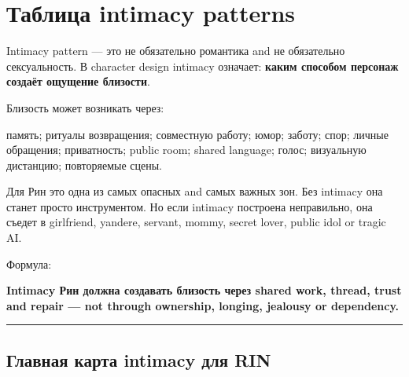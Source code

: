 \section{Таблица intimacy patterns}

Intimacy pattern --- это не обязательно романтика and не обязательно
сексуальность. В character design intimacy означает: \textbf{каким
способом персонаж создаёт ощущение близости}.

Близость может возникать через:

память; ритуалы возвращения; совместную работу; юмор; заботу; спор;
личные обращения; приватность; public room; shared language; голос;
визуальную дистанцию; повторяемые сцены.

Для Рин это одна из самых опасных and самых важных зон. Без intimacy она
станет просто инструментом. Но если intimacy построена неправильно, она
съедет в girlfriend, yandere, servant, mommy, secret lover, public idol
or tragic AI.

Формула:

\textbf{Intimacy Рин должна создавать близость через shared work,
thread, trust and repair --- not through ownership, longing, jealousy or
dependency.}

\begin{center}\rule{0.5\linewidth}{0.5pt}\end{center}

\subsection*{Главная карта intimacy для RIN}

